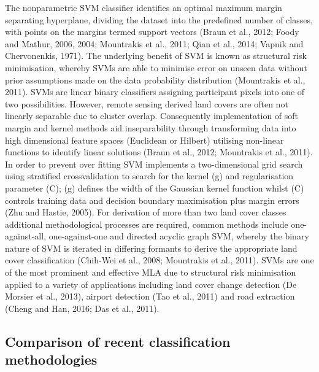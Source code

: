 \documentclass[]{book}
\begin{document}
The nonparametric SVM classifier identifies an optimal maximum margin
separating hyperplane, dividing the dataset into the predefined number
of classes, with points on the margins termed support vectors (Braun et
al., 2012; Foody and Mathur, 2006, 2004; Mountrakis et al., 2011; Qian
et al., 2014; Vapnik and Chervonenkis, 1971). The underlying benefit of
SVM is known as structural risk minimisation, whereby SVMs are able to
minimise error on unseen data without prior assumptions made on the data
probability distribution (Mountrakis et al., 2011). SVMs are linear
binary classifiers assigning participant pixels into one of two
possibilities. However, remote sensing derived land covers are often not
linearly separable due to cluster overlap. Consequently implementation
of soft margin and kernel methods aid inseparability through
transforming data into high dimensional feature spaces (Euclidean or
Hilbert) utilising non-linear functions to identify linear solutions
(Braun et al., 2012; Mountrakis et al., 2011). In order to prevent over
fitting SVM implements a two-dimensional grid search using stratified
crossvalidation to search for the kernel (g) and regularisation
parameter (C); (g) defines the width of the Gaussian kernel function
whilst (C) controls training data and decision boundary maximisation
plus margin errors (Zhu and Hastie, 2005). For derivation of more than
two land cover classes additional methodological processes are required,
common methods include one-against-all, one-against-one and directed
acyclic graph SVM, whereby the binary nature of SVM is iterated in
differing formants to derive the appropriate land cover classification
(Chih-Wei et al., 2008; Mountrakis et al., 2011). SVMs are one of the
most prominent and effective MLA due to structural risk minimisation
applied to a variety of applications including land cover change
detection (De Morsier et al., 2013), airport detection (Tao et al.,
2011) and road extraction (Cheng and Han, 2016; Das et al., 2011).

\subsection{Comparison of recent classification
methodologies}\label{comparison-of-recent-classification-methodologies}
\end{document}
